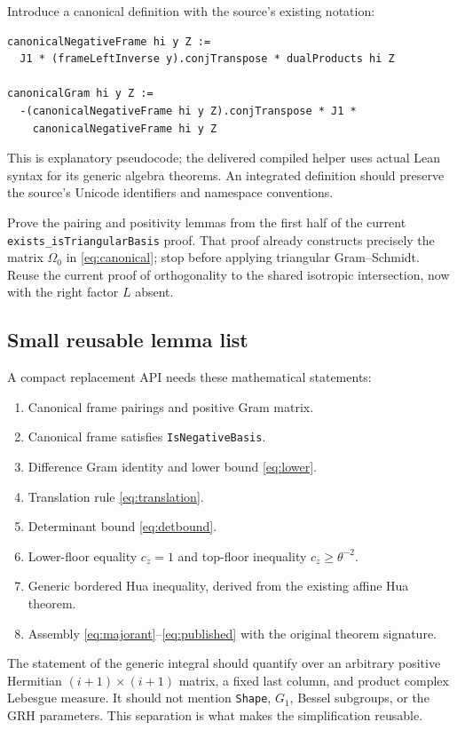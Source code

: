 \documentclass[11pt,letterpaper]{article}
\theoremstyle{remark}
\newcommand{\code}[1]{{\small\urlstyle{tt}\nolinkurl{#1}}}
\begin{document}
Introduce a canonical definition with the source's existing notation:
\begin{lstlisting}
canonicalNegativeFrame hi y Z :=
  J1 * (frameLeftInverse y).conjTranspose * dualProducts hi Z

canonicalGram hi y Z :=
  -(canonicalNegativeFrame hi y Z).conjTranspose * J1 *
    canonicalNegativeFrame hi y Z
\end{lstlisting}
This is explanatory pseudocode; the delivered compiled helper uses actual Lean
syntax for its generic algebra theorems. An integrated definition should preserve
the source's Unicode identifiers and namespace conventions.

Prove the pairing and positivity lemmas from the first half of the current
\code{exists_isTriangularBasis} proof. That proof already constructs precisely
the matrix $\Omega_0$ in \eqref{eq:canonical}; stop before applying triangular
Gram--Schmidt. Reuse the current proof of orthogonality to the shared isotropic
intersection, now with the right factor $L$ absent.

\subsection{Small reusable lemma list}

A compact replacement API needs these mathematical statements:
\begin{enumerate}
\item Canonical frame pairings and positive Gram matrix.
\item Canonical frame satisfies \code{IsNegativeBasis}.
\item Difference Gram identity and lower bound \eqref{eq:lower}.
\item Translation rule \eqref{eq:translation}.
\item Determinant bound \eqref{eq:detbound}.
\item Lower-floor equality $c_z=1$ and top-floor inequality $c_z\geq\theta^{-2}$.
\item Generic bordered Hua inequality, derived from the existing affine Hua theorem.
\item Assembly \eqref{eq:majorant}--\eqref{eq:published} with the original theorem signature.
\end{enumerate}

The statement of the generic integral should quantify over an arbitrary positive
Hermitian $(i+1)\times(i+1)$ matrix, a fixed last column, and product complex
Lebesgue measure. It should not mention \code{Shape}, $G_1$, Bessel subgroups,
or the GRH parameters. This separation is what makes the simplification reusable.
\end{document}
